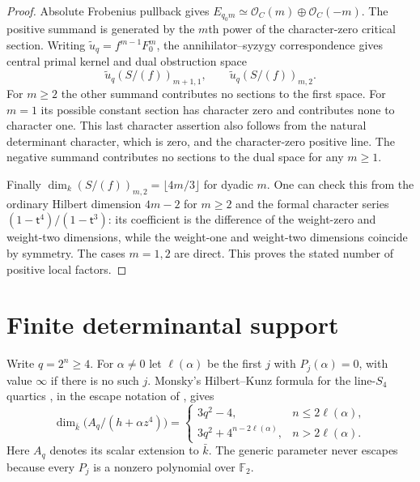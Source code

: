 \documentclass[11pt,a4paper,reqno]{amsart}
\numberwithin{equation}{section}
\theoremstyle{plain}
\theoremstyle{definition}
\theoremstyle{remark}
\begin{document}
\begin{proof}
Absolute Frobenius pullback gives $E_{q_0m}\simeq\mathcal O_C(m)\oplus\mathcal
O_C(-m)$. The positive summand is generated by the $m$th power of the character-zero
critical section. Writing $\widetilde u_q=f^{m-1}F_0^m$, the annihilator--syzygy
correspondence gives central primal kernel and dual obstruction space
\[
\widetilde u_q(S/(f))_{m+1,1},\qquad
\widetilde u_q(S/(f))_{m,2}.
\]
For $m\geq2$ the other summand contributes no sections to the first space. For $m=1$
its possible constant section has character zero and contributes none to character
one. This last character assertion also follows from the natural determinant
character, which is zero, and the character-zero positive line. The negative summand
contributes no sections to the dual space for any $m\geq1$.

Finally $\dim_k(S/(f))_{m,2}=\lfloor4m/3\rfloor$ for dyadic $m$. One can check this
from the ordinary Hilbert dimension $4m-2$ for $m\geq2$ and the formal character
series $(1-\mathsf t^4)/(1-\mathsf t^3)$: its coefficient is the difference of the
weight-zero and weight-two dimensions, while the weight-one and weight-two dimensions
coincide by symmetry. The cases $m=1,2$ are direct. This proves the stated number of
positive local factors.

\end{proof}

\section{Finite determinantal support}\label{sec:support}
Write $q=2^n\geq4$. For $\alpha\ne0$ let $\ell(\alpha)$ be the first
$j$ with $P_j(\alpha)=0$, with value $\infty$ if there is no such $j$.
Monsky's Hilbert--Kunz formula for the line-$S_4$ quartics
\cite[Corollary 3.15 and Theorem 5.8]{Monsky}, in the escape notation of \cite{Borevitz}, gives
\begin{equation}\label{eq:HK-fibre}
\dim_{\bar k}\bigl(A_q/(h+\alpha z^4)\bigr)=
\begin{cases}
3q^2-4,&n\leq2\ell(\alpha),\\
3q^2+4^{n-2\ell(\alpha)},&n>2\ell(\alpha).
\end{cases}
\end{equation}
Here $A_q$ denotes its scalar extension to $\bar k$. The generic parameter never escapes
because every $P_j$ is a nonzero polynomial over $\mathbb F_2$.
\end{document}

